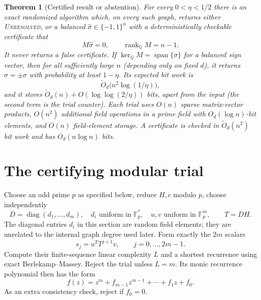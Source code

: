 \documentclass[11pt]{article}
\newtheorem{theorem}{Theorem}
\newcommand{\F}{\mathbb F}
\newcommand{\rank}{\operatorname{rank}}
\newcommand{\kerQ}{\ker_{\mathbb Q}}
\begin{document}
\begin{theorem}[Certified result or abstention]\label{thm:algorithm}
For every $0<\eta<1/2$ there is an exact randomized algorithm which,
on every such graph, returns either \textnormal{\textsc{Unresolved}}, or a balanced
$\widehat\sigma\in\{-1,1\}^n$ with a deterministically checkable
certificate that
\[
 M\widehat\sigma=0,\qquad \rank_{\mathbb Q}M=n-1.
\]
It never returns a false certificate. If
$\kerQ M=\operatorname{span}\{\sigma\}$ for a balanced sign vector,
then for all sufficiently large $n$ (depending only on fixed $d$),
it returns $\widehat\sigma=\pm\sigma$ with probability at least
$1-\eta$. Its expected bit work is
\[
 \widetilde O_d\bigl(n^2\log(1/\eta)\bigr),
\]
and it stores $\widetilde O_d(n)+O(\log\log(2/\eta))$ bits,
apart from the input (the second term is the trial counter).
Each trial uses $O(n)$ sparse matrix-vector products, $O(n^2)$
additional field operations in a prime field with $O_d(\log n)$-bit
elements, and $O(n)$ field-element storage. A certificate is checked
in $\widetilde O_d(n^2)$ bit work and has $O_d(n\log n)$ bits.
\end{theorem}

\section{The certifying modular trial}
Choose an odd prime $p$ as specified below, reduce $H,c$ modulo $p$,
choose independently
\[
 D=\operatorname{diag}(d_1,\ldots,d_m),\quad
 d_i\text{ uniform in }\F_p^*,\quad
 u,v\text{ uniform in }\F_p^m,
 \qquad T=DH.
\]
The diagonal entries $d_i$ in this section are random field elements;
they are unrelated to the internal graph degree used later.
Form exactly the $2m$ scalars
\begin{equation}\label{eq:shift}
 s_j=u^TT^{j+1}v,\qquad j=0,\ldots,2m-1.
\end{equation}
Compute their finite-sequence linear complexity $L$ and a shortest
recurrence using exact Berlekamp--Massey. Reject the trial unless
$L=m$. Its monic recurrence polynomial then has the form
\[
 f(z)=z^m+f_{m-1}z^{m-1}+\cdots+f_1z+f_0.
\]
As an extra consistency check, reject if $f_0=0$.
\end{document}
